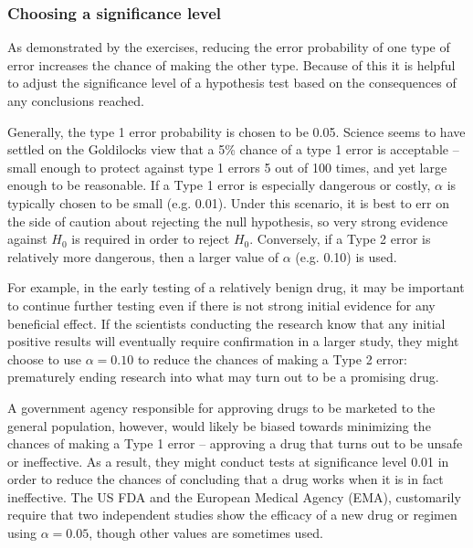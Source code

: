 \begin{spacing}{1.5}
\subsubsection{Choosing a significance level}

As demonstrated by the exercises, reducing the error probability of one type of error increases the chance of making the other type. Because of this it is helpful to adjust the significance level of a hypothesis test based on the consequences of any conclusions reached.

\label{significanceLevel}


Generally, the type 1 error probability is chosen to be 0.05.  Science seems to have settled on the Goldilocks view that a 5\% chance of a type 1 error is acceptable  -- small enough to protect against type 1 errors 5 out of 100 times, and yet large enough to be reasonable. If a Type 1 error is especially dangerous or costly,  $\alpha$ is typically chosen to be small (e.g. 0.01). Under this scenario, it is best to err on the side of caution about rejecting the null hypothesis, so very strong evidence against $H_0$ is required in order to reject $H_0$. Conversely, if a Type 2 error is relatively more dangerous, then a larger value of $\alpha$ (e.g. 0.10) is used. 

For example, in the early testing of a relatively benign drug, it may be important to continue further testing even if there is not strong initial evidence for any beneficial effect. If the scientists conducting the research know that any initial positive results will eventually require confirmation in a larger study, they might choose to use $\alpha = 0.10$ to reduce the chances of making a Type 2 error: prematurely ending research into what may turn out to be a promising drug. 

A government agency responsible for approving drugs to be marketed to the general population, however, would likely be biased towards minimizing the chances of making a Type 1 error -- approving a drug that turns out to be unsafe or ineffective. As a result, they might conduct tests at significance level 0.01 in order to reduce the chances of concluding that a drug works when it is in fact ineffective. The US FDA and the European Medical Agency (EMA), customarily require that two independent studies show the efficacy of a new drug or regimen using $\alpha = 0.05$, though other values are sometimes used.


\end{spacing}
